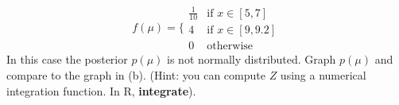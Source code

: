 \documentclass{article}
\begin{document}
\begin{enumerate}
\begin{enumerate}
\begin{equation}
f(\mu) = \bigg\{
\begin{array}{cc}
\frac{1}{10} & \text{if } x \in [5,7] \\
4 & \text{if } x \in [9,9.2] \\
0 & \text{otherwise}
\end{array}
\end{equation}
In this case the posterior $p(\mu)$ is not normally distributed.  Graph $p(\mu)$ and compare to the graph in (b).   (Hint:  you can compute $Z$ using a numerical integration function.  In R, \textbf{integrate}).
\end{enumerate}



\end{enumerate}
\end{document}
